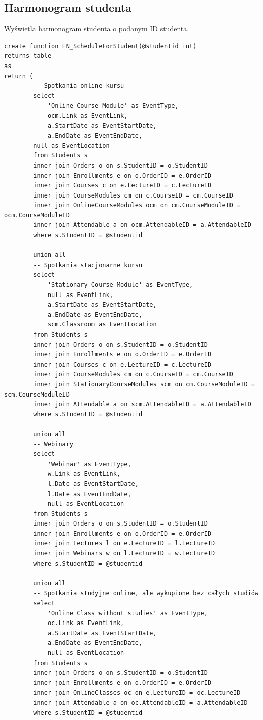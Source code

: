 \documentclass[11pt,a4paper]{article}
\begin{document}
\subsection{Harmonogram studenta}
Wyświetla harmonogram studenta o podanym ID studenta.
\begin{Verbatim}[breaklines=true]
create function FN_ScheduleForStudent(@studentid int)
returns table
as
return (
        -- Spotkania online kursu
        select
            'Online Course Module' as EventType,
            ocm.Link as EventLink,
            a.StartDate as EventStartDate,
            a.EndDate as EventEndDate,
        null as EventLocation
        from Students s
        inner join Orders o on s.StudentID = o.StudentID
        inner join Enrollments e on o.OrderID = e.OrderID
        inner join Courses c on e.LectureID = c.LectureID
        inner join CourseModules cm on c.CourseID = cm.CourseID
        inner join OnlineCourseModules ocm on cm.CourseModuleID = ocm.CourseModuleID
        inner join Attendable a on ocm.AttendableID = a.AttendableID
        where s.StudentID = @studentid

        union all
        -- Spotkania stacjonarne kursu
        select
            'Stationary Course Module' as EventType,
            null as EventLink,
            a.StartDate as EventStartDate,
            a.EndDate as EventEndDate,
            scm.Classroom as EventLocation
        from Students s
        inner join Orders o on s.StudentID = o.StudentID
        inner join Enrollments e on o.OrderID = e.OrderID
        inner join Courses c on e.LectureID = c.LectureID
        inner join CourseModules cm on c.CourseID = cm.CourseID
        inner join StationaryCourseModules scm on cm.CourseModuleID = scm.CourseModuleID
        inner join Attendable a on scm.AttendableID = a.AttendableID
        where s.StudentID = @studentid

        union all
        -- Webinary
        select
            'Webinar' as EventType,
            w.Link as EventLink,
            l.Date as EventStartDate,
            l.Date as EventEndDate,
            null as EventLocation
        from Students s
        inner join Orders o on s.StudentID = o.StudentID
        inner join Enrollments e on o.OrderID = e.OrderID
        inner join Lectures l on e.LectureID = l.LectureID
        inner join Webinars w on l.LectureID = w.LectureID
        where s.StudentID = @studentid

        union all
        -- Spotkania studyjne online, ale wykupione bez całych studiów
        select
            'Online Class without studies' as EventType,
            oc.Link as EventLink,
            a.StartDate as EventStartDate,
            a.EndDate as EventEndDate,
            null as EventLocation
        from Students s
        inner join Orders o on s.StudentID = o.StudentID
        inner join Enrollments e on o.OrderID = e.OrderID
        inner join OnlineClasses oc on e.LectureID = oc.LectureID
        inner join Attendable a on oc.AttendableID = a.AttendableID
        where s.StudentID = @studentid


\end{Verbatim}
\end{document}
